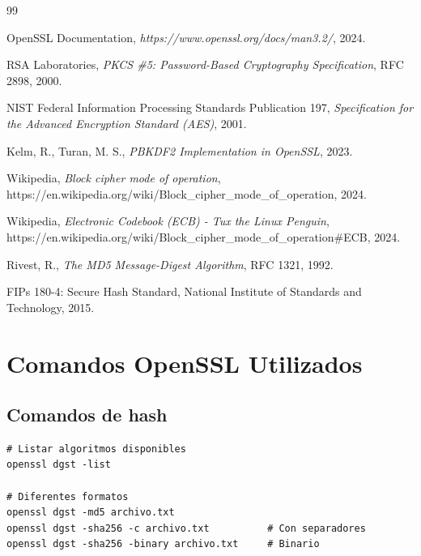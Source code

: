 \documentclass[12pt,a4paper]{report}
\begin{document}
\begin{thebibliography}{99}

 OpenSSL Documentation, \textit{https://www.openssl.org/docs/man3.2/}, 2024.

 RSA Laboratories, \textit{PKCS \#5: Password-Based Cryptography Specification}, RFC 2898, 2000.

 NIST Federal Information Processing Standards Publication 197, \textit{Specification for the Advanced Encryption Standard (AES)}, 2001.

 Kelm, R., Turan, M. S., \textit{PBKDF2 Implementation in OpenSSL}, 2023.

 Wikipedia, \textit{Block cipher mode of operation}, https://en.wikipedia.org/wiki/Block\_cipher\_mode\_of\_operation, 2024.

 Wikipedia, \textit{Electronic Codebook (ECB) - Tux the Linux Penguin}, https://en.wikipedia.org/wiki/Block\_cipher\_mode\_of\_operation\#ECB, 2024.

 Rivest, R., \textit{The MD5 Message-Digest Algorithm}, RFC 1321, 1992.

 FIPs 180-4: Secure Hash Standard, National Institute of Standards and Technology, 2015.

\end{thebibliography}


\appendix

\chapter{Comandos OpenSSL Utilizados}

\section{Comandos de hash}

\begin{lstlisting}[caption=Comandos para resúmenes]
# Listar algoritmos disponibles
openssl dgst -list

# Diferentes formatos
openssl dgst -md5 archivo.txt
openssl dgst -sha256 -c archivo.txt          # Con separadores
openssl dgst -sha256 -binary archivo.txt     # Binario
\end{lstlisting}
\end{document}
